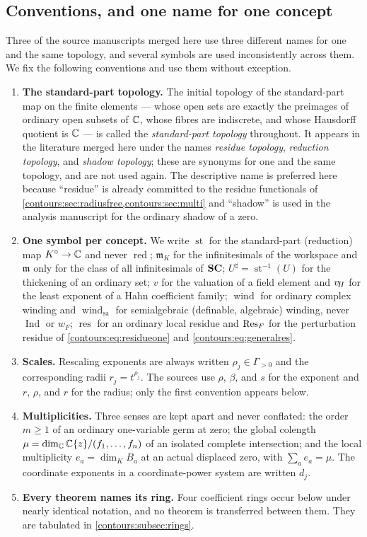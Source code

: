 \documentclass[11pt,letterpaper]{article}
\theoremstyle{definition}
\theoremstyle{remark}
\newcommand{\m}{\mathfrak m}\newcommand{\st}{\operatorname{st}}
\newcommand{\res}{\operatorname{res}}\newcommand{\wind}{\operatorname{wind}}
\newcommand{\red}{\operatorname{red}}\newcommand{\Ind}{\operatorname{Ind}}
\newcommand{\sh}{^{\sharp}}\newcommand{\dd}{\,d}
\numberwithin{equation}{section}
\begin{document}
\subsection{Conventions, and one name for one concept}
\label{contours:subsec:conventions}
Three of the source manuscripts merged here use three different names for one and
the same topology, and several symbols are used inconsistently across them. We fix
the following conventions and use them without exception.

\begin{enumerate}
\item \textbf{The standard-part topology.} The initial topology of the
standard-part map on the finite elements --- whose open sets are exactly the
preimages of ordinary open subsets of $\mathbb C$, whose fibres are indiscrete, and whose
Hausdorff quotient is $\mathbb C$ --- is called the \emph{standard-part topology}
throughout. It appears in the literature merged here under the names
\emph{residue topology}, \emph{reduction topology}, and \emph{shadow topology};
these are synonyms for one and the same topology, and are not used again. The
descriptive name is preferred here because ``residue'' is already committed to the
residue functionals of \cref{contours:sec:radiusfree,contours:sec:multi} and
``shadow'' is used in the analysis manuscript for the ordinary shadow of a zero.
\item \textbf{One symbol per concept.} We write $\st$ for the standard-part
(reduction) map $K^\circ\to\mathbb C$ and never $\red$; $\m_K$ for the infinitesimals of
the workspace and $\m$ only for the class of all infinitesimals of $\mathbf{SC}$;
$U\sh=\st^{-1}(U)$ for the thickening of an ordinary set; $v$ for the valuation of
a field element and $v_{\!H}$ for the least exponent of a Hahn coefficient family;
$\wind$ for ordinary complex winding and $\wind_{\mathrm{sa}}$ for semialgebraic
(definable, algebraic) winding, never $\operatorname{Ind}$ or $w_F$; $\res$ for an ordinary local
residue and $\operatorname{Res}_F$ for the perturbation residue of \eqref{contours:eq:residueone}
and \eqref{contours:eq:generalres}.
\item \textbf{Scales.} Rescaling exponents are always written $\rho_j\in
\Gamma_{>0}$ and the corresponding radii $r_j=t^{\rho_j}$. The sources use
$\rho$, $\beta$, and $s$ for the exponent and $r$, $\rho$, and $r$ for the radius;
only the first convention appears below.
\item \textbf{Multiplicities.} Three senses are kept apart and never conflated:
the order $m\ge1$ of an ordinary one-variable germ at zero; the global colength
$\mu=\dim_\mathbb C\mathbb C\{z\}/(f_1,\ldots,f_n)$ of an isolated complete intersection; and the
local multiplicity $e_a=\dim_K B_a$ at an actual displaced zero, with
$\sum_ae_a=\mu$. The coordinate exponents in a coordinate-power system are written
$d_j$.
\item \textbf{Every theorem names its ring.} Four coefficient rings occur below
under nearly identical notation, and no theorem is transferred between them. They
are tabulated in \cref{contours:subsec:rings}.
\end{enumerate}
\end{document}
